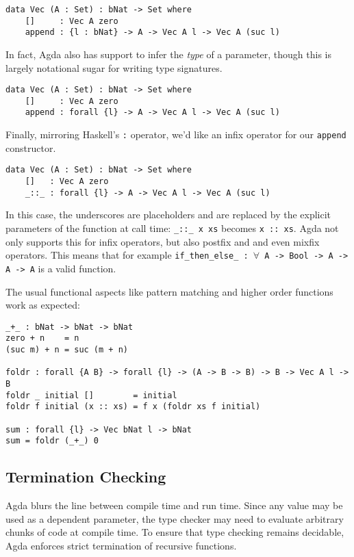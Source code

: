 \begin{lstlisting}[caption={A Simple Vector Type, Take Two},label={lst:tutorial:vec:2},emph={Vec,append}]
data Vec (A : Set) : bNat -> Set where
    []     : Vec A zero
    append : {l : bNat} -> A -> Vec A l -> Vec A (suc l)
\end{lstlisting}

In fact, Agda also has support to infer the \emph{type} of a parameter, though this is largely notational sugar for writing type signatures.

\begin{lstlisting}[caption={A Simple Vector Type, Take Three},label={lst:tutorial:vec:3},emph={Vec,append}]
data Vec (A : Set) : bNat -> Set where
    []     : Vec A zero
    append : forall {l} -> A -> Vec A l -> Vec A (suc l)
\end{lstlisting}

Finally, mirroring Haskell's \texttt{:} operator, we'd like an infix operator for our \texttt{append} constructor.

\begin{lstlisting}[caption={A Simple Vector Type, Take Four},label={lst:tutorial:vec:4},emph={Vec}]
data Vec (A : Set) : bNat -> Set where
    []   : Vec A zero
    _::_ : forall {l} -> A -> Vec A l -> Vec A (suc l)
\end{lstlisting}

In this case, the underscores are placeholders and are replaced by the explicit parameters of the function at call time: \texttt{\_::\_ x xs} becomes \texttt{x :: xs}. Agda not only supports this for infix operators, but also postfix and and even mixfix operators. This means that for example \texttt{if\_then\_else\_ : $\forall$ {A} -> Bool -> A -> A -> A} is a valid function.

The usual functional aspects like pattern matching and higher order functions work as expected:

\begin{lstlisting}[caption={Functions},label={lst:tutorial:functional},emph={foldr,sum}]
_+_ : bNat -> bNat -> bNat
zero + n    = n
(suc m) + n = suc (m + n)

foldr : forall {A B} -> forall {l} -> (A -> B -> B) -> B -> Vec A l -> B
foldr _ initial []        = initial
foldr f initial (x :: xs) = f x (foldr xs f initial)

sum : forall {l} -> Vec bNat l -> bNat
sum = foldr (_+_) 0
\end{lstlisting}

\subsection{Termination Checking}
\label{sec:termination-checking}
Agda blurs the line between compile time and run time. Since any value may be used as a dependent parameter, the type checker may need to evaluate arbitrary chunks of code at compile time. To ensure that type checking remains decidable, Agda enforces strict termination of recursive functions.

